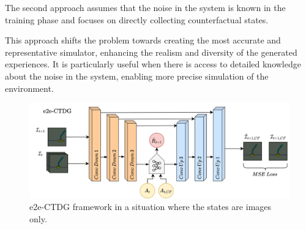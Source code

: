 The second approach assumes that the noise in the system is known
in the training phase and focuses on directly collecting
counterfactual states.

This approach shifts the problem towards creating the most
accurate and representative simulator, enhancing the
realism and diversity of the generated experiences.
It is particularly useful when there is access to detailed
knowledge about the noise in the system, enabling more
precise simulation of the environment.

\begin{figure}[ht]
    \centering
    \includegraphics[width=\textwidth]{figures/ch4/2.e2e.png}
    \caption{e2e-CTDG framework in a situation where the states are
    images only.}
    \label{fig:wre}
\end{figure}